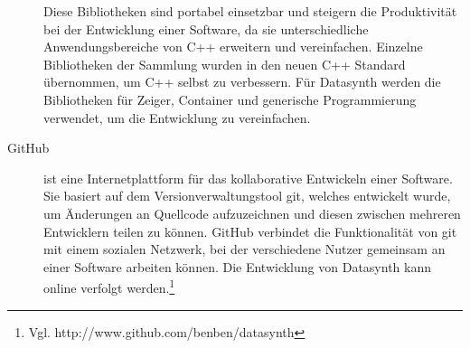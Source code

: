 \documentclass[a4paper, 
               12pt,
               DIV=calc,
               version=first,
               pdftex,
               headsepline,
               footsepline,
               bibliography=totocnumbered,
               listof=numbered]{scrreprt}
\begin{document}
\begin{description}
Diese Bibliotheken sind portabel einsetzbar und steigern die
Produktivität bei der Entwicklung einer Software, da sie unterschiedliche
Anwendungsbereiche von C++ erweitern und vereinfachen.
Einzelne Bibliotheken der Sammlung wurden in den neuen C++ Standard
übernommen, um C++ selbst zu verbessern.
Für Datasynth werden die Bibliotheken für Zeiger, Container
und generische Programmierung verwendet, um die Entwicklung zu vereinfachen.
\item[GitHub]
ist eine Internetplattform für das kollaborative Entwickeln einer Software.
Sie basiert auf dem Versionverwaltungstool git, welches entwickelt wurde,
um Änderungen an Quellcode aufzuzeichnen und diesen zwischen mehreren
Entwicklern teilen zu können. GitHub verbindet die Funktionalität von git mit
einem sozialen Netzwerk, bei der verschiedene Nutzer gemeinsam
an einer Software arbeiten können. Die Entwicklung von Datasynth kann online 
verfolgt werden.\footnote{Vgl. http://www.github.com/benben/datasynth}
\end{description}
\end{document}
